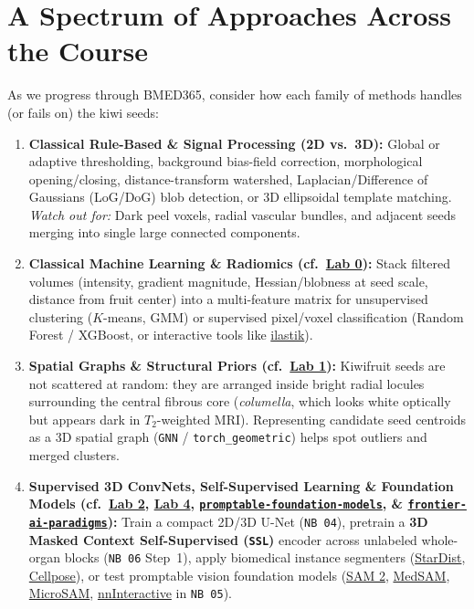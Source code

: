 \documentclass[10pt,a4paper]{article}
\newcommand{\ghblob}{https://github.com/arvidl/BMED365-2027/blob/main}
\newcommand{\ghtree}{https://github.com/arvidl/BMED365-2027/tree/main}
\begin{document}
\section{A Spectrum of Approaches Across the Course}

As we progress through BMED365, consider how each family of methods handles (or fails on) the kiwi seeds:

\begin{enumerate}
    \item \textbf{Classical Rule-Based \& Signal Processing (2D vs.\ 3D):} Global or adaptive thresholding, background bias-field correction, morphological opening/closing, distance-transform watershed, Laplacian/Difference of Gaussians (LoG/DoG) blob detection, or 3D ellipsoidal template matching. \textit{Watch out for:} Dark peel voxels, radial vascular bundles, and adjacent seeds merging into single large connected components.
    \item \textbf{Classical Machine Learning \& Radiomics (cf.\ \href{\ghblob/Lab0-ML/README.md}{Lab 0}):} Stack filtered volumes (intensity, gradient magnitude, Hessian/blobness at seed scale, distance from fruit center) into a multi-feature matrix for unsupervised clustering ($K$-means, GMM) or supervised pixel/voxel classification (Random Forest / XGBoost, or interactive tools like \href{https://www.ilastik.org/}{ilastik}).
    \item \textbf{Spatial Graphs \& Structural Priors (cf.\ \href{\ghblob/Lab1-NetworkSci-PSN/README.md}{Lab 1}):} Kiwifruit seeds are not scattered at random: they are arranged inside bright radial locules surrounding the central fibrous core (\textit{columella}, which looks white optically but appears dark in $T_2$-weighted MRI). Representing candidate seed centroids as a 3D spatial graph (\texttt{GNN} / \texttt{torch\_geometric}) helps spot outliers and merged clusters.
    \item \textbf{Supervised 3D ConvNets, Self-Supervised Learning \& Foundation Models (cf.\ \href{\ghtree/Lab2-DL}{Lab 2}, \href{\ghblob/Lab4-Comp-Imag/README.md}{Lab 4}, \href{\ghblob/Lab4-Comp-Imag/Kiwi-challenge/docs/promptable-foundation-models.md}{\texttt{promptable-foundation-models}}, \& \href{\ghblob/Lab4-Comp-Imag/Kiwi-challenge/docs/frontier-ai-paradigms.md}{\texttt{frontier-ai-paradigms}}):} Train a compact 2D/3D U-Net (\texttt{NB 04}), pretrain a \textbf{3D Masked Context Self-Supervised (\texttt{SSL})} encoder across unlabeled whole-organ blocks (\texttt{NB 06} Step~1), apply biomedical instance segmenters (\href{https://github.com/stardist/stardist}{StarDist}, \href{https://www.cellpose.org/}{Cellpose}), or test promptable vision foundation models (\href{https://github.com/facebookresearch/sam2}{SAM 2}, \href{https://github.com/bowang-lab/MedSAM}{MedSAM}, \href{https://github.com/computational-cell-analytics/micro-sam}{MicroSAM}, \href{https://huggingface.co/MIC-DKFZ/nnInteractive}{nnInteractive} in \texttt{NB 05}).

\end{enumerate}
\end{document}
